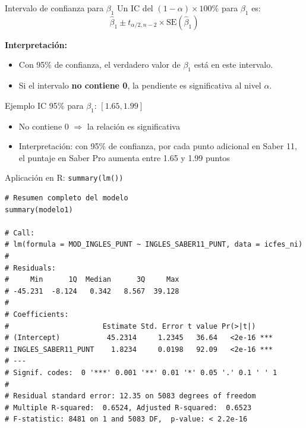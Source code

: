 \documentclass[aspectratio=169, 11pt]{beamer}
\begin{document}
\begin{frame}{Intervalo de confianza para $\beta_1$}
Un IC del $(1-\alpha) \times 100\%$ para $\beta_1$ es:
\[
\hat{\beta}_1 \pm t_{\alpha/2, n-2} \times \text{SE}(\hat{\beta}_1)
\]

\vspace{0.2cm}
\textbf{Interpretación:}
\begin{itemize}
  \item Con 95\% de confianza, el verdadero valor de $\beta_1$ está en este intervalo.
  \item Si el intervalo \textbf{no contiene 0}, la pendiente es significativa al nivel $\alpha$.
\end{itemize}

\vspace{0.3cm}
\begin{exampleblock}{Ejemplo}
IC 95\% para $\beta_1$: $[1.65, 1.99]$
\begin{itemize}
  \item No contiene 0 $\Rightarrow$ la relación es significativa
  \item Interpretación: con 95\% de confianza, por cada punto adicional en Saber 11, el puntaje en Saber Pro aumenta entre 1.65 y 1.99 puntos
\end{itemize}
\end{exampleblock}
\end{frame}

\begin{frame}[fragile]{Aplicaci\'on en R: \texttt{summary(lm())}}
\begin{lstlisting}[basicstyle=\ttfamily\scriptsize]
# Resumen completo del modelo
summary(modelo1)

# Call:
# lm(formula = MOD_INGLES_PUNT ~ INGLES_SABER11_PUNT, data = icfes_ni)
#
# Residuals:
#     Min      1Q  Median      3Q     Max
# -45.231  -8.124   0.342   8.567  39.128
#
# Coefficients:
#                      Estimate Std. Error t value Pr(>|t|)
# (Intercept)           45.2314     1.2345   36.64   <2e-16 ***
# INGLES_SABER11_PUNT    1.8234     0.0198   92.09   <2e-16 ***
# ---
# Signif. codes:  0 '***' 0.001 '**' 0.01 '*' 0.05 '.' 0.1 ' ' 1
#
# Residual standard error: 12.35 on 5083 degrees of freedom
# Multiple R-squared:  0.6524, Adjusted R-squared:  0.6523
# F-statistic: 8481 on 1 and 5083 DF,  p-value: < 2.2e-16
\end{lstlisting}
\end{frame}
\end{document}

